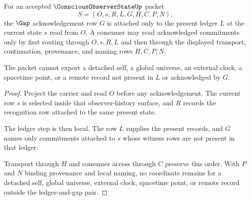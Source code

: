 \begin{theorem}
\label{thm:conscious-observer-state-gap-ledger-nonescape}
For an accepted $\ConsciousObserverStateUp$ packet
$$
S=(O,s,R,L,G,H,C,P,N),
$$
the $\Gap$ acknowledgement row $G$ is attached only to the present ledger $L$ at the current state $s$ read from $O$. A consumer may read acknowledged commitments only by first routing through $O,s,R,L$ and then through the displayed transport, continuation, provenance, and naming rows $H,C,P,N$.

The packet cannot export a detached self, a global universe, an external clock, a spacetime point, or a remote record not present in $L$ or acknowledged by $G$.
\end{theorem}
\begin{proof}
Project the carrier and read $O$ before any acknowledgement. The current row $s$ is selected inside that observer-history surface, and $R$ records the recognition row attached to the same present state.

The ledger step is then local. The row $L$ supplies the present records, and $G$ names only commitments attached to $s$ whose witness rows are not present in that ledger.

Transport through $H$ and consumer access through $C$ preserve this order. With $P$ and $N$ binding provenance and local naming, no coordinate remains for a detached self, global universe, external clock, spacetime point, or remote record outside the ledger-and-gap pair.
\end{proof}

